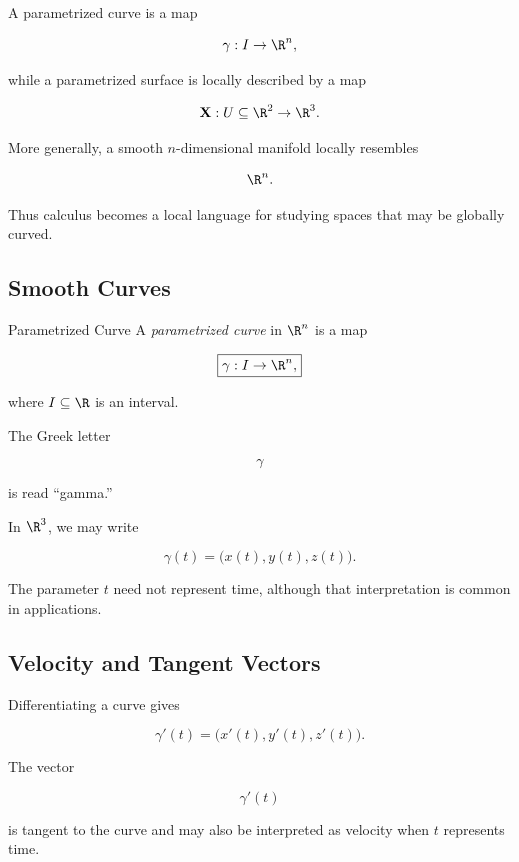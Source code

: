 A parametrized curve is a map

\[
\gamma:I\to\R^n,
\]

while a parametrized surface is locally described by a map

\[
\mathbf{X}:U\subseteq\R^2\to\R^3.
\]

More generally, a smooth \(n\)-dimensional manifold locally resembles

\[
\R^n.
\]

Thus calculus becomes a local language for studying spaces that may be
globally curved.

\subsection{Smooth Curves}
\label{subsec:smooth-curves}

\begin{definitionbox}{Parametrized Curve}
A \emph{parametrized curve} in \(\R^n\) is a map

\[
\boxed{
\gamma:I\to\R^n,
}
\]

where \(I\subseteq\R\) is an interval.
\end{definitionbox}

The Greek letter

\[
\gamma
\]

is read ``gamma.''

In \(\R^3\), we may write

\[
\boxed{
\gamma(t)
=
\bigl(x(t),y(t),z(t)\bigr).
}
\]

The parameter \(t\) need not represent time, although that interpretation is
common in applications.

\subsection{Velocity and Tangent Vectors}
\label{subsec:curve-velocity-tangent}

Differentiating a curve gives

\[
\boxed{
\gamma'(t)
=
\bigl(x'(t),y'(t),z'(t)\bigr).
}
\]

The vector

\[
\gamma'(t)
\]

is tangent to the curve and may also be interpreted as velocity when \(t\)
represents time.


